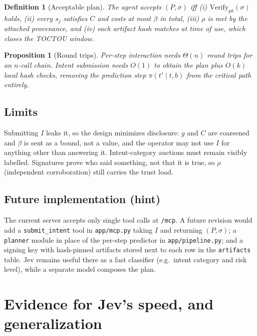 \documentclass[11pt]{article}
\newtheorem{definition}{Definition}
\newtheorem{proposition}{Proposition}
\begin{document}
\begin{definition}[Acceptable plan]
The agent accepts $(P,\sigma)$ iff (i) $\mathrm{Verify}_{pk}(\sigma)$ holds, (ii) every $s_j$ satisfies $C$
and costs at most $\beta$ in total, (iii) $\rho$ is met by the attached provenance, and (iv) each
artifact hash matches at time of use, which closes the TOCTOU window.
\end{definition}

\begin{proposition}[Round trips]
Per-step interaction needs $\Theta(n)$ round trips for an $n$-call chain. Intent submission needs
$O(1)$ to obtain the plan plus $O(k)$ local hash checks, removing the prediction step
$\pi(t'\mid t,b)$ from the critical path entirely.
\end{proposition}

\subsection{Limits}
Submitting $I$ leaks it, so the design minimizes disclosure: $g$ and $C$ are coarsened and $\beta$
is sent as a bound, not a value, and the operator may not use $I$ for anything other than
answering it. Intent-category auctions must remain visibly labelled. Signatures prove who said
something, not that it is true, so $\rho$ (independent corroboration) still carries the trust load.

\subsection{Future implementation (hint)}
The current server accepts only single tool calls at \texttt{/mcp}. A future revision would add a
\texttt{submit\_intent} tool in \texttt{app/mcp.py} taking $I$ and returning $(P,\sigma)$;
a \texttt{planner} module in place of the per-step predictor in \texttt{app/pipeline.py};
and a signing key with hash-pinned artifacts stored next to each row in the \texttt{artifacts}
table. Jev remains useful there as a fast classifier (e.g.\ intent category and risk level),
while a separate model composes the plan.

\section{Evidence for Jev's speed, and generalization}
\end{document}
